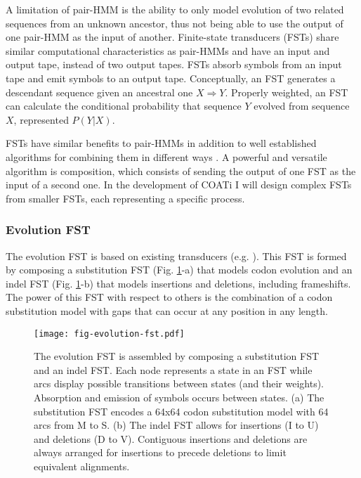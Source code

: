 A limitation of pair-HMM is the ability to only model evolution of two related
sequences from an unknown ancestor, thus not being able to use the output of one
pair-HMM as the input of another.
Finite-state transducers (FSTs) share similar computational characteristics as
pair-HMMs and have an input and output tape, instead of two output tapes.
FSTs absorb symbols from an input tape and emit symbols to an output tape.
Conceptually, an FST generates a descendant sequence given an ancestral one
$X \Rightarrow Y$.
Properly weighted, an FST can calculate the conditional probability that
sequence $Y$ evolved from sequence $X$, represented $P(Y|X)$.

FSTs have similar benefits to pair-HMMs in addition to well established
algorithms for combining them in different ways
\parencite{bradley2007transducers}.
A powerful and versatile algorithm is composition, which consists of sending the
output of one FST as the input of a second one.
In the development of COATi I will design complex FSTs from smaller FSTs, each
representing a specific process.

\subsubsection{Evolution FST}

The evolution FST is based on existing transducers
(e.g. \cite{holmes2001evolutionary}).
This FST is formed by composing a substitution FST (Fig.
\ref{fig:evolution-fst}-a) that models codon evolution and an indel FST (Fig.
\ref{fig:evolution-fst}-b) that models insertions and deletions, including
frameshifts.
The power of this FST with respect to others is the combination of a codon
substitution model with gaps that can occur at any position in any length.

\begin{figure}[h!]
\begin{framed}
\centering
    \texttt{[image: fig-evolution-fst.pdf]}
    \caption{The evolution FST is assembled by composing a substitution FST and
    an indel FST. Each node represents a state in an FST while arcs display
    possible transitions between states (and their weights). Absorption and
    emission of symbols occurs between states. (a) The substitution FST
    encodes a 64x64 codon substitution model with 64 arcs from M to S. (b)
    The indel FST allows for insertions (I to U) and deletions (D to V).
    Contiguous insertions and deletions are always arranged for insertions to
    precede deletions to limit equivalent alignments.}
    \label{fig:evolution-fst}
\end{framed}
\end{figure}

